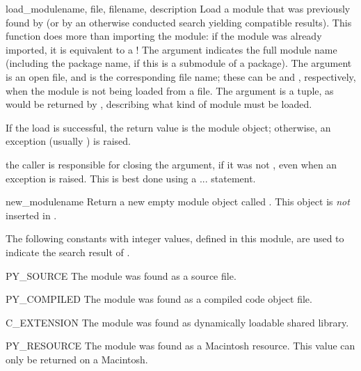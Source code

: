 \begin{funcdesc}{load_module}{name, file, filename, description}
Load a module that was previously found by  (or by
an otherwise conducted search yielding compatible results).  This
function does more than importing the module: if the module was
already imported, it is equivalent to a
!  The  argument
indicates the full module name (including the package name, if this is
a submodule of a package).  The  argument is an open file,
and  is the corresponding file name; these can be
 and , respectively, when the module is not being
loaded from a file.  The  argument is a tuple, as
would be returned by , describing what kind
of module must be loaded.

If the load is successful, the return value is the module object;
otherwise, an exception (usually ) is raised.

 the caller is responsible for closing the
 argument, if it was not , even when an exception
is raised.  This is best done using a 
...  statement.
\end{funcdesc}

\begin{funcdesc}{new_module}{name}
Return a new empty module object called .  This object is
\emph{not} inserted in .
\end{funcdesc}

The following constants with integer values, defined in this module,
are used to indicate the search result of .

\begin{datadesc}{PY_SOURCE}
The module was found as a source file.
\end{datadesc}

\begin{datadesc}{PY_COMPILED}
The module was found as a compiled code object file.
\end{datadesc}

\begin{datadesc}{C_EXTENSION}
The module was found as dynamically loadable shared library.
\end{datadesc}

\begin{datadesc}{PY_RESOURCE}
The module was found as a Macintosh resource.  This value can only be
returned on a Macintosh.
\end{datadesc}

